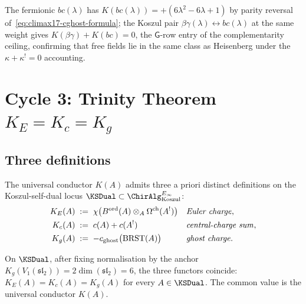 \begin{remark}
\label{rem:climax17-K-bc}
The fermionic $bc(\lambda)$ has $K(bc(\lambda))=+(6\lambda^2-6\lambda+1)$
by parity reversal of~\eqref{eq:climax17-cghost-formula}; the Koszul
pair $\beta\gamma(\lambda)\leftrightarrow bc(\lambda)$ at the same
weight gives $K(\beta\gamma)+K(bc)=0$, the $\mathsf{G}$-row entry of
the complementarity ceiling, confirming that free fields lie in the
same class as Heisenberg under the $\kappa+\kappa^!=0$ accounting.
\end{remark}

\section{Cycle 3: Trinity Theorem \texorpdfstring{$K_E=K_c=K_g$}{KE=Kc=Kg}}
\label{sec:climax17-cycle3}

\subsection{Three definitions}

The universal conductor $K(A)$ admits three a priori distinct
definitions on the Koszul-self-dual locus
$\KSDual\subset\ChirAlg^{E_\infty}_{\mathrm{Koszul}}$:
\begin{align}
  K_E(A)\;&:=\;\chi\bigl(B^{\mathrm{ord}}(A)\otimes_A\Omega^{\mathrm{ch}}(A^!)\bigr)
    &&\text{\emph{Euler charge}},
\label{eq:climax17-KE}\\
  K_c(A)\;&:=\;c(A)+c(A^!)
    &&\text{\emph{central-charge sum}},
\label{eq:climax17-Kc}\\
  K_g(A)\;&:=\;-c_{\mathrm{ghost}}\bigl(\mathrm{BRST}(A)\bigr)
    &&\text{\emph{ghost charge}}.
\label{eq:climax17-Kg}
\end{align}

\begin{theorem}[Trinity]
\label{thm:climax17-trinity}
\ClaimStatusProvedHere
On $\KSDual$, after fixing normalisation by the anchor
$K_g(V_1(\mathfrak{sl}_2))=2\dim(\mathfrak{sl}_2)=6$, the three
functors coincide: $K_E(A)=K_c(A)=K_g(A)$ for every
$A\in\KSDual$. The common value is the universal conductor $K(A)$.
\end{theorem}

